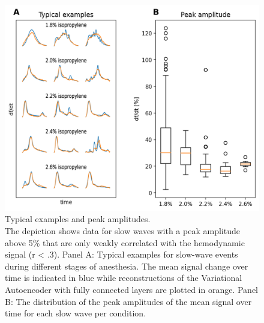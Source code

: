 \begin{figure}[!htb]
\centering
\includegraphics[width=\textwidth,height=\textheight,keepaspectratio]{Figures/typical_examples_and_peak_amplitudes}
\decoRule
\caption[Typical examples and peak amplitudes]{Typical examples and peak amplitudes.\\The depiction shows data for slow waves with a peak amplitude above 5\% that are only weakly correlated with the hemodynamic signal (r < .3). Panel A: Typical examples for slow-wave events during different stages of anesthesia. The mean signal change over time is indicated in blue while reconstructions of the Variational Autoencoder with fully connected layers are plotted in orange. Panel B: The distribution of the peak amplitudes of the mean signal over time for each slow wave per condition.}
\label{fig:typical_examples_and_peak_amplitudes}
\end{figure}

